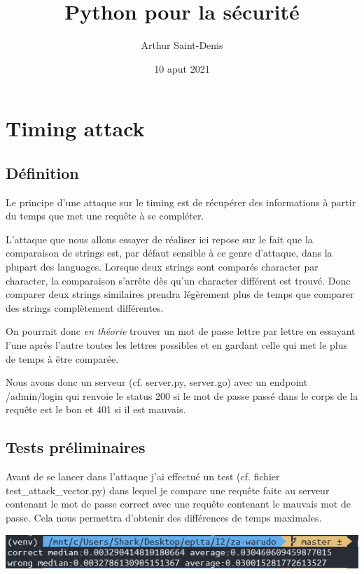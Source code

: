 \documentclass{article}
\title{Python pour la sécurité}
\date{10 aput 2021}
\author{Arthur Saint-Denis}
\begin{document}
\maketitle

\section*{Timing attack}
\subsection*{Définition}

Le principe d'une attaque sur le timing est de récupérer des informations  à partir du temps que met une requête à se compléter.

L'attaque que nous allons essayer de réaliser ici repose sur le fait que 
la comparaison de strings est, par défaut sensible à ce genre d'attaque, dans la plupart des languages.
Lorsque deux strings sont comparés character par character, la comparaison s'arrête dès qu'un character différent est trouvé. Donc comparer deux strings similaires prendra légèrement plus de temps que comparer des strings complètement différentes.

On pourrait donc \emph{en théorie} trouver un mot de passe lettre par lettre en essayant l'une après l'autre toutes les lettres possibles et en gardant celle qui met le plus de temps à être comparée.

Nous avons donc un serveur (cf. server.py, server.go) avec un endpoint /admin/login qui renvoie le status 200 si le mot de passe passé dans le corps de la requête est le bon et 401 si il est mauvais.

\subsection*{Tests préliminaires}

Avant de se lancer dans l'attaque j'ai effectué un test (cf. fichier test\_attack\_vector.py) dans lequel je compare une requête faite au serveur contenant le mot de passe correct avec une requête contenant le mauvais mot de passe. Cela nous permettra d'obtenir des différences de temps maximales.

\begin{center}
    \includegraphics[scale=0.8]{attack_results.png}
\end{center}
\end{document}

